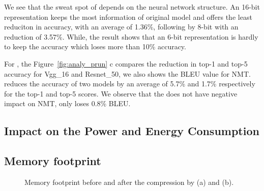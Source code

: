 We see that the sweat spot of \quantization depends on the neural network structure. 
An 16-bit representation keeps the most information of original model and offers the least reduciton in accuracy,
with an average of 1.36\%, following by 8-bit with an reduction of 3.57\%.
While, the result shows that an 6-bit representation is hardly to keep the accuracy which loses more than 10\% accuracy.

For \pruning, the Figure~\ref{fig:analy_prun} c compares the reduction in top-1 and top-5 accuracy for Vgg\_16 and Resnet\_50, 
we also shows the BLEU value for NMT.
\pruning reduces the accuracy of two models by an average of 5.7\% and 1.7\% respectively for the top-1 and top-5 scores.
We observe that the \pruning does not have negative impact on NMT, only loses 0.8\% BLEU. 





\subsection{Impact on the Power and Energy Consumption}


\subsection{Memory footprint}

\begin{figure}[!t]
\centering
{}
\hfill
{}
\hfill

\caption{Memory footprint before and after the compression by \quantization(a) and \pruning (b).}
\label{fig:footprint}
\end{figure}
